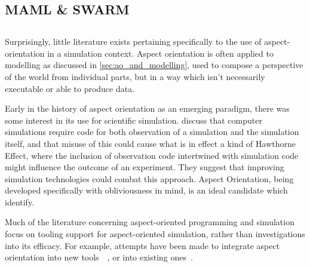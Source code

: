\subsection{MAML \& SWARM}


\subsection{}




Surprisingly, little literature exists pertaining specifically to the use of
aspect-orientation in a simulation context. Aspect orientation is often applied
to modelling as discussed in \cref{sec:ao_and_modelling}, used to compose a perspective of the world from individual
parts, but in a way which isn't necessarily executable or able to produce data.

Early in the history of aspect orientation as an emerging paradigm, there was
some interest in its use for scientific simulation. \cite{gulyas1999use} discuss
that computer simulations require code for both observation of a simulation and
the simulation itself, and that misuse of this could cause what is in effect a
kind of Hawthorne Effect, where
the inclusion of observation code intertwined with simulation code might
influence the outcome of an experiment. They suggest that improving simulation
technologies could combat this approach. Aspect Orientation, being developed
specifically with obliviousness in mind, is an ideal candidate which
\citeauthor{gulyas1999use} identify.

Much of the literature concerning aspect-oriented programming and simulation
focus on tooling support for aspect-oriented simulation, rather than
investigations into its efficacy. For example, attempts have been made to
integrate aspect orientation into new
tools~\cite{DEVSaspectorientation2008aksu}~, or into existing ones~\cite{chibani2019using}. 

